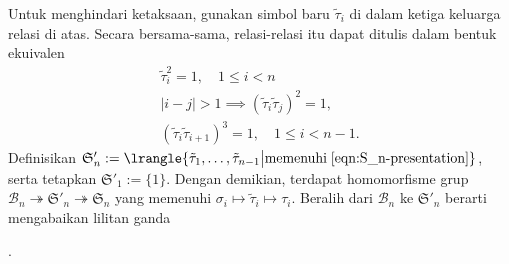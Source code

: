 Untuk menghindari ketaksaan, gunakan simbol baru $\tilde{\tau}_i$ di dalam ketiga keluarga relasi di atas. Secara bersama-sama, relasi-relasi itu dapat ditulis dalam bentuk ekuivalen
\begin{equation}\label{eqn:S_n-presentation}\begin{gathered}
	\tilde{\tau}_i^2 = 1, \quad 1 \leq i < n \\
	|i-j| > 1 \implies (\tilde{\tau}_i \tilde{\tau}_j)^2 = 1, \\
	(\tilde{\tau}_i \tilde{\tau}_{i+1})^3 = 1, \quad 1 \leq i < n-1.
\end{gathered}\end{equation}
Definisikan $\mathfrak{S}'_n := \lrangle{\tilde{\tau}_1, \ldots, \tilde{\tau}_{n-1} \big| \text{memenuhi}\; \eqref{eqn:S_n-presentation} }$, serta tetapkan $\mathfrak{S}'_1 := \{1\}$. Dengan demikian, terdapat homomorfisme grup $\mathcal{B}_n \twoheadrightarrow \mathfrak{S}'_n \twoheadrightarrow \mathfrak{S}_n$ yang memenuhi $\sigma_i \mapsto \tilde{\tau}_i \mapsto \tau_i$. Beralih dari $\mathcal{B}_n$ ke $\mathfrak{S}'_n$ berarti mengabaikan lilitan ganda
.

